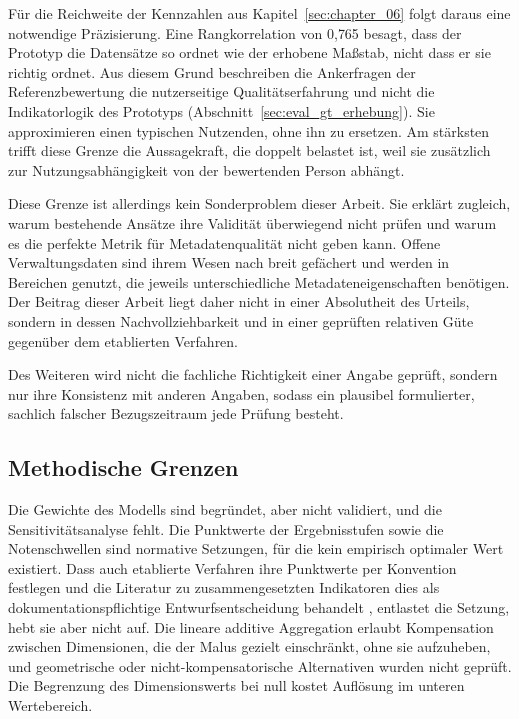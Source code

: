 Für die Reichweite der Kennzahlen aus Kapitel~\ref{sec:chapter_06} folgt daraus eine notwendige Präzisierung. Eine Rangkorrelation von 0{,}765 besagt, dass der
Prototyp die Datensätze so ordnet wie der erhobene Maßstab, nicht dass er sie
richtig ordnet. Aus diesem Grund beschreiben die Ankerfragen der Referenzbewertung die
nutzerseitige Qualitätserfahrung und nicht die Indikatorlogik des Prototyps
(Abschnitt~\ref{sec:eval_gt_erhebung}). Sie approximieren einen typischen
Nutzenden, ohne ihn zu ersetzen. Am stärksten
trifft diese Grenze die Aussagekraft, die doppelt belastet ist, weil sie
zusätzlich zur Nutzungsabhängigkeit von der bewertenden Person abhängt.

Diese Grenze ist allerdings kein Sonderproblem dieser Arbeit. Sie erklärt
zugleich, warum bestehende Ansätze ihre Validität überwiegend nicht prüfen und
warum es die perfekte Metrik für Metadatenqualität nicht geben kann. Offene Verwaltungsdaten sind ihrem Wesen
nach breit gefächert und werden in Bereichen genutzt, die jeweils unterschiedliche
Metadateneigenschaften benötigen. Der Beitrag dieser Arbeit liegt daher nicht in
einer Absolutheit des Urteils, sondern in dessen Nachvollziehbarkeit und in einer
geprüften relativen Güte gegenüber dem etablierten Verfahren.

Des Weiteren wird nicht die fachliche
Richtigkeit einer Angabe geprüft, sondern nur ihre Konsistenz mit
anderen Angaben, sodass ein plausibel formulierter, sachlich falscher
Bezugszeitraum jede Prüfung besteht.

\subsection{Methodische Grenzen}
Die Gewichte des Modells sind begründet, aber nicht validiert, und die
Sensitivitätsanalyse fehlt. Die Punktwerte der Ergebnisstufen sowie die
Notenschwellen sind normative Setzungen, für die kein empirisch optimaler Wert
existiert. Dass auch etablierte Verfahren ihre Punktwerte per Konvention
festlegen und die Literatur zu zusammengesetzten Indikatoren dies als
dokumentationspflichtige Entwurfsentscheidung behandelt
\cite{nardo2008handbook}, entlastet die Setzung, hebt sie aber nicht auf. Die
lineare additive Aggregation erlaubt Kompensation zwischen Dimensionen, die der
Malus gezielt einschränkt, ohne sie aufzuheben, und geometrische oder
nicht-kompensatorische Alternativen wurden nicht geprüft. Die Begrenzung des
Dimensionswerts bei null kostet Auflösung im unteren Wertebereich.


